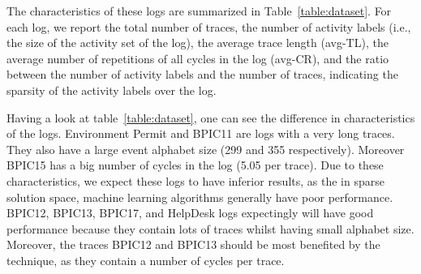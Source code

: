 The characteristics of these logs are summarized in Table~\ref{table:dataset}. For each log, we report the total number of traces, the number of activity labels (i.e., the size of the activity set of the log), the average trace length (avg-TL), the average number of repetitions of all cycles in the log (avg-CR), and the ratio between the number of activity labels and the number of traces, indicating the sparsity of the activity labels over the log.




Having a look at table~\ref{table:dataset}, one can see the difference in characteristics of the logs. Environment Permit and BPIC11 are logs with a very long traces. They also have a large event alphabet size (299 and 355 respectively). Moreover BPIC15 has a big number of cycles in the log (5.05 per trace). Due to these characteristics, we expect these logs to have inferior results, as the in sparse solution space, machine learning algorithms generally have poor performance. BPIC12, BPIC13, BPIC17, and HelpDesk logs expectingly will have good performance because they contain lots of traces whilst having small alphabet size. Moreover, the traces BPIC12 and BPIC13 should be most benefited by the \nocycle technique, as they contain a number of cycles per trace.


